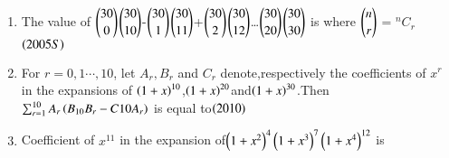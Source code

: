 \documentclass[journal,12pt,twocolumn]{IEEEtran}
\theoremstyle{remark}
\begin{document}
\begin{enumerate}
\item The value of
$\dbinom{30}{0}$$\dbinom{30}{10}$-$\dbinom{30}{1}$$\dbinom{30}{11}$+$\dbinom{30}{2}$$\dbinom{30}{12}$\dots$\dbinom{30}{20}$$\dbinom{30}{30}$ is where $\dbinom{n}{r}$ = $^nC_r${\hfill$\left(2005S\right)$}
\begin{enumerate}[label=(\alph*)]
\end{enumerate}
\item For $r=0,1\cdots,10$, let $A_r,B_r$ and $C_r$ denote,respectively the coefficients of $x^r$ in the expansions of $\left(1+x\right)^{10}$,$\left(1+x\right)^{20}$and$\left(1+x\right)^{30}$.Then $\sum_{r=1}^{10}A_r\left(B_{10}B_r-C{10}A_r\right)$ is equal to{\hfill$\left(2010\right)$}
\begin{enumerate}[label=(\alph*)]
\end{enumerate}

\item  Coefficient of $x^{11}$ in the expansion of$ \left(1+x^2\right)^4 \left(1+x^3\right)^7 \left(1+x^4\right)^{12}$ is \\
{\hfill {}}

\begin{enumerate}[label=(\alph*)]
\end{enumerate}
\end{enumerate}
\end{document}
